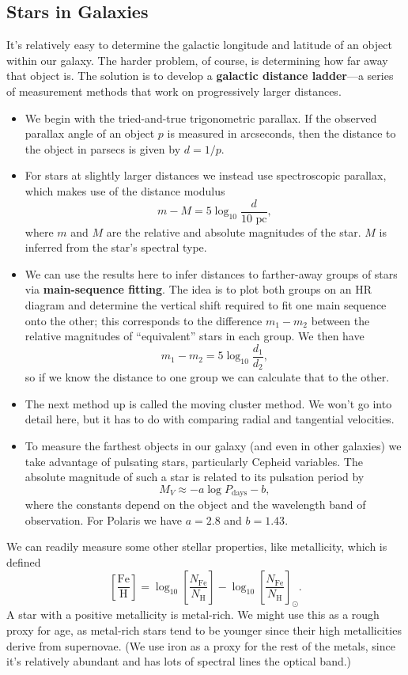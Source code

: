 \documentclass[../a062main.tex]{subfiles}
\begin{document}
\subsection*{Stars in Galaxies}
It's relatively easy to determine the galactic longitude and latitude of an object within our galaxy.
The harder problem, of course, is determining how far away that object is.
The solution is to develop a \textbf{galactic distance ladder}---a series of measurement methods that work on progressively larger distances.
\begin{itemize}
    \item We begin with the tried-and-true trigonometric parallax.
    If the observed parallax angle of an object $p$ is measured in arcseconds, then the distance to the object in parsecs is given by $d = 1 / p$.

    \item For stars at slightly larger distances we instead use spectroscopic parallax, which makes use of the distance modulus
    \[ m - M = 5 \log_{10} \frac{d}{10 \textrm{ pc}}, \]
    where $m$ and $M$ are the relative and absolute magnitudes of the star.
    $M$ is inferred from the star's spectral type.

    \item We can use the results here to infer distances to farther-away groups of stars via \textbf{main-sequence fitting}.
    The idea is to plot both groups on an HR diagram and determine the vertical shift required to fit one main sequence onto the other; this corresponds to the difference $m_1 - m_2$ between the relative magnitudes of ``equivalent'' stars in each group.
    We then have
    \[ m_1 - m_2 = 5 \log_{10} \frac{d_1}{d_2}, \]
    so if we know the distance to one group we can calculate that to the other.

    \item The next method up is called the moving cluster method.
    We won't go into detail here, but it has to do with comparing radial and tangential velocities.

    \item To measure the farthest objects in our galaxy (and even in other galaxies) we take advantage of pulsating stars, particularly Cepheid variables.
    The absolute magnitude of such a star is related to its pulsation period by
    \[ M_V \approx -a \log P_\textrm{days} - b, \]
    where the constants depend on the object and the wavelength band of observation.
    For Polaris we have $a = 2.8$ and $b = 1.43$.
\end{itemize}
We can readily measure some other stellar properties, like metallicity, which is defined
\[ \left[ \frac{\textrm{Fe}}{\textrm{H}} \right] = \log_{10} \left[ \frac{N_\textrm{Fe}}{N_\textrm{H}} \right] - \log_{10} \left[ \frac{N_\textrm{Fe}}{N_\textrm{H}} \right]_\odot. \]
A star with a positive metallicity is metal-rich.
We might use this as a rough proxy for age, as metal-rich stars tend to be younger since their high metallicities derive from supernovae.
(We use iron as a proxy for the rest of the metals, since it's relatively abundant and has lots of spectral lines  the optical band.)
\end{document}
